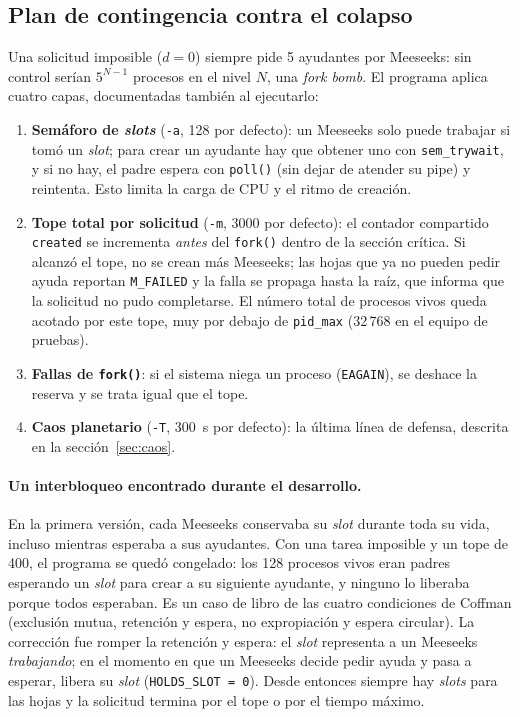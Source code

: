 \documentclass[11pt,letterpaper]{article}
\begin{document}
\subsection{Plan de contingencia contra el colapso}\label{sec:contingencia}

Una solicitud imposible ($d=0$) siempre pide 5 ayudantes por Meeseeks: sin control serían
$5^{N-1}$ procesos en el nivel $N$, una \emph{fork bomb}. El programa aplica cuatro capas,
documentadas también al ejecutarlo:

\begin{enumerate}[leftmargin=1.5em]
\item \textbf{Semáforo de \emph{slots}} (\texttt{-a}, 128 por defecto): un Meeseeks solo
  puede trabajar si tomó un \emph{slot}; para crear un ayudante hay que obtener uno con
  \texttt{sem\_trywait}, y si no hay, el padre espera con \texttt{poll()} (sin dejar de
  atender su pipe) y reintenta. Esto limita la carga de CPU y el ritmo de creación.
\item \textbf{Tope total por solicitud} (\texttt{-m}, 3000 por defecto): el contador
  compartido \texttt{created} se incrementa \emph{antes} del \texttt{fork()} dentro de la
  sección crítica. Si alcanzó el tope, no se crean más Meeseeks; las hojas que ya no pueden
  pedir ayuda reportan \texttt{M\_FAILED} y la falla se propaga hasta la raíz, que informa
  que la solicitud no pudo completarse. El número total de procesos vivos queda acotado por
  este tope, muy por debajo de \texttt{pid\_max} (32\,768 en el equipo de pruebas).
\item \textbf{Fallas de \texttt{fork()}}: si el sistema niega un proceso
  (\texttt{EAGAIN}), se deshace la reserva y se trata igual que el tope.
\item \textbf{Caos planetario} (\texttt{-T}, 300~s por defecto): la última línea de
  defensa, descrita en la sección~\ref{sec:caos}.
\end{enumerate}

\paragraph{Un interbloqueo encontrado durante el desarrollo.} En la primera versión, cada
Meeseeks conservaba su \emph{slot} durante toda su vida, incluso mientras esperaba a sus
ayudantes. Con una tarea imposible y un tope de 400, el programa se quedó congelado: los
128 procesos vivos eran padres esperando un \emph{slot} para crear a su siguiente ayudante,
y ninguno lo liberaba porque todos esperaban. Es un caso de libro de las cuatro condiciones
de Coffman (exclusión mutua, retención y espera, no expropiación y espera circular). La
corrección fue romper la retención y espera: el \emph{slot} representa a un Meeseeks
\emph{trabajando}; en el momento en que un Meeseeks decide pedir ayuda y pasa a esperar,
libera su \emph{slot} (\texttt{HOLDS\_SLOT = 0}). Desde entonces siempre hay \emph{slots}
para las hojas y la solicitud termina por el tope o por el tiempo máximo.
\end{document}
